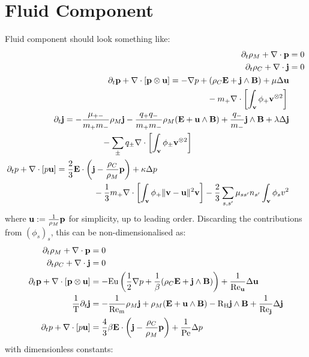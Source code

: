 \chapter{Fluid Component}



    Fluid component should look something like:
    \begin{align}
        \partial_{t}\rho_{M} + \nabla\cdot\mathbf{p}  &=  0  \\
        \partial_{t}\rho_{C} + \nabla\cdot\mathbf{j}  &=  0  \\
        \begin{split}
            \partial_{t}\mathbf{p} + \nabla\cdot[\mathbf{p}\otimes\mathbf{u}]  &=  - \nabla p + (\rho_{C}\mathbf{E} + \mathbf{j}\wedge\mathbf{B}) + \mu\Delta\mathbf{u}  \\
            &\;\;\;\;\;\;\;\;\;\;\;\;\;\;\;\;  - m_{+}\nabla\cdot\left[\int_{\mathbf{v}}\phi_{+}\mathbf{v}^{\otimes 2}\right]
        \end{split}  \\
        \begin{split}
            \partial_{t}\mathbf{j}  &=  - \frac{\mu_{+-}}{m_{+}m_{-}}\rho_{M}\mathbf{j} - \frac{q_{+}q_{-}}{m_{+}m_{-}}\rho_{M}(\mathbf{E} + \mathbf{u}\wedge\mathbf{B}) + \frac{q_{-}}{m_{-}}\mathbf{j}\wedge\mathbf{B} + \lambda\Delta\mathbf{j}  \\
            &\;\;\;\;\;\;\;\;\;\;\;\;\;\;\;\;   - \sum_{\pm}q_{\pm}\nabla\cdot\left[\int_{\mathbf{v}}\phi_{\pm}\mathbf{v}^{\otimes 2}\right]
        \end{split}  \\
        \begin{split}
            \partial_{t}p + \nabla\cdot[p\mathbf{u}]  &=  \frac{2}{3}\mathbf{E}\cdot\left(\mathbf{j} - \frac{\rho_{C}}{\rho_{M}}\mathbf{p}\right) + \kappa\Delta p  \\
            &\;\;\;\;\;\;\;\;\;\;\;\;\;\;\;\;  - \frac{1}{3}m_{+}\nabla\cdot\left[\int_{\mathbf{v}}\phi_{+}\|\mathbf{v} - \mathbf{u}\|^{2}\mathbf{v}\right] - \frac{2}{3}\sum_{s, s'}\mu_{ss'}n_{s'}\int_{\mathbf{v}}\phi_{s}v^{2}
        \end{split}
    \end{align}
    where $\mathbf{u}  :=  \frac{1}{\rho_{M}}\mathbf{p}$ for simplicity, up to leading order. Discarding the contributions from $(\phi_{s})_{s}$, this can be non-dimensionalised as:
    \begin{align}
        \partial_{t}\rho_{M} + \nabla\cdot\mathbf{p}  &=  0  \\
        \partial_{t}\rho_{C} + \nabla\cdot\mathbf{j}  &=  0  \\
        \partial_{t}\mathbf{p} + \nabla\cdot[\mathbf{p}\otimes\mathbf{u}]  &=  - \mathrm{Eu}\left(\frac{1}{2}\nabla p + \frac{1}{\beta}(\rho_{C}\mathbf{E} + \mathbf{j}\wedge\mathbf{B})\right) + \frac{1}{\mathrm{Re}_{\mathbf{u}}}\Delta\mathbf{u}  \\
        \frac{1}{\mathrm{T}}\partial_{t}\mathbf{j}  &=  - \frac{1}{\mathrm{Re}_{\mathrm{m}}}\rho_{M}\mathbf{j} + \rho_{M}(\mathbf{E} + \mathbf{u}\wedge\mathbf{B}) - \mathrm{R}_{\mathrm{H}}\mathbf{j}\wedge\mathbf{B} + \frac{1}{\mathrm{Re}_{\mathbf{j}}}\Delta\mathbf{j}  \\
        \partial_{t}p + \nabla\cdot[p\mathbf{u}]  &=  \frac{4}{3}\beta\mathbf{E}\cdot\left(\mathbf{j} - \frac{\rho_{C}}{\rho_{M}}\mathbf{p}\right) + \frac{1}{\mathrm{Pe}}\Delta p
    \end{align}
    with dimensionless constants:
    

